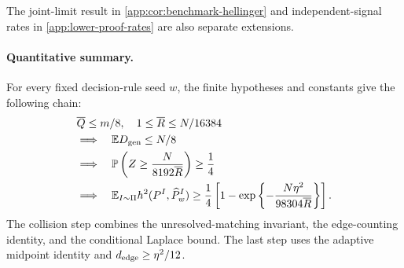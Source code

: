 \ifincludeexponents
The joint-limit result in \cref{app:cor:benchmark-hellinger} and
independent-signal rates in \cref{app:lower-proof-rates} are also separate
extensions.
\fi

\paragraph{Quantitative summary.}
For every fixed decision-rule seed \(w\), the finite hypotheses and
constants give the following chain:
\begin{equation}
 \begin{aligned}
 &\QueryBudget{}\le\HardBankSize/8,\quad
 1\le\RoundBudget{}\le N/16384\\
 &\Longrightarrow\quad
 \mathbb E\GenieDeletions\le N/8\\
 &\Longrightarrow\quad
 \mathbb P\left(\TotalCollisions\ge
                 \frac{N}{8192\RoundBudget{}}\right)\ge\frac14\\
 &\Longrightarrow\quad
 \mathbb E_{I\sim\HardInstancePrior}\sqHellinger
   (\HardTargetLaw{I},\HardOutputLaw{I}{w})
 \ge\frac14\left[1-\exp\left\{
       -\frac{N\EdgeCoupling^2}{98304\RoundBudget{}}\right\}\right].
 \end{aligned}
 \label{app:eq:lower-proof-spine}
\end{equation}
The collision step combines the unresolved-matching invariant, the
edge-counting identity, and the conditional Laplace bound.
The last step uses the adaptive midpoint identity and
$\HardEdgeDistance\ge\EdgeCoupling^2/12$.









